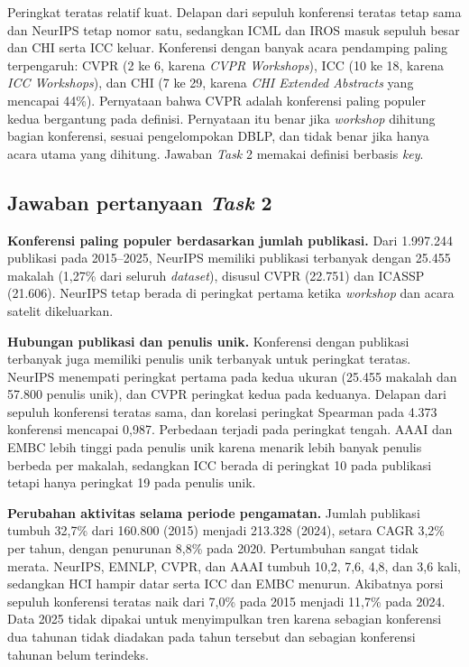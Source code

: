 Peringkat teratas relatif kuat. Delapan dari sepuluh konferensi teratas tetap sama dan NeurIPS tetap nomor satu, sedangkan ICML dan IROS masuk sepuluh besar dan CHI serta ICC keluar. Konferensi dengan banyak acara pendamping paling terpengaruh: CVPR (2 ke 6, karena \textit{CVPR Workshops}), ICC (10 ke 18, karena \textit{ICC Workshops}), dan CHI (7 ke 29, karena \textit{CHI Extended Abstracts} yang mencapai 44\%). Pernyataan bahwa CVPR adalah konferensi paling populer kedua bergantung pada definisi. Pernyataan itu benar jika \textit{workshop} dihitung bagian konferensi, sesuai pengelompokan DBLP, dan tidak benar jika hanya acara utama yang dihitung. Jawaban \textit{Task} 2 memakai definisi berbasis \textit{key}.

\subsection{Jawaban pertanyaan \textit{Task} 2}
\label{sec:jawab-t2}
\textbf{Konferensi paling populer berdasarkan jumlah publikasi.} Dari 1.997.244 publikasi pada 2015--2025, NeurIPS memiliki publikasi terbanyak dengan 25.455 makalah (1,27\% dari seluruh \textit{dataset}), disusul CVPR (22.751) dan ICASSP (21.606). NeurIPS tetap berada di peringkat pertama ketika \textit{workshop} dan acara satelit dikeluarkan.

\textbf{Hubungan publikasi dan penulis unik.} Konferensi dengan publikasi terbanyak juga memiliki penulis unik terbanyak untuk peringkat teratas. NeurIPS menempati peringkat pertama pada kedua ukuran (25.455 makalah dan 57.800 penulis unik), dan CVPR peringkat kedua pada keduanya. Delapan dari sepuluh konferensi teratas sama, dan korelasi peringkat Spearman pada 4.373 konferensi mencapai 0,987. Perbedaan terjadi pada peringkat tengah. AAAI dan EMBC lebih tinggi pada penulis unik karena menarik lebih banyak penulis berbeda per makalah, sedangkan ICC berada di peringkat 10 pada publikasi tetapi hanya peringkat 19 pada penulis unik.

\textbf{Perubahan aktivitas selama periode pengamatan.} Jumlah publikasi tumbuh 32,7\% dari 160.800 (2015) menjadi 213.328 (2024), setara CAGR 3,2\% per tahun, dengan penurunan 8,8\% pada 2020. Pertumbuhan sangat tidak merata. NeurIPS, EMNLP, CVPR, dan AAAI tumbuh 10,2, 7,6, 4,8, dan 3,6 kali, sedangkan HCI hampir datar serta ICC dan EMBC menurun. Akibatnya porsi sepuluh konferensi teratas naik dari 7,0\% pada 2015 menjadi 11,7\% pada 2024. Data 2025 tidak dipakai untuk menyimpulkan tren karena sebagian konferensi dua tahunan tidak diadakan pada tahun tersebut dan sebagian konferensi tahunan belum terindeks.
